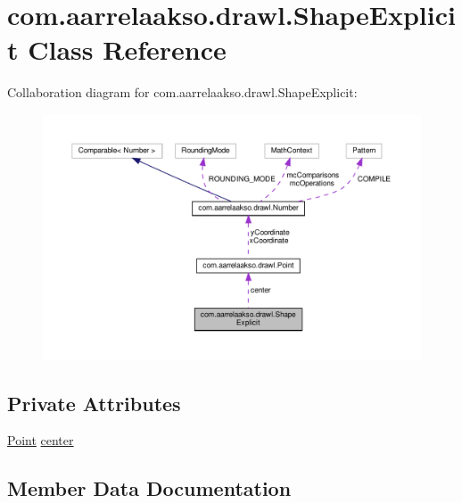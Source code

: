 \hypertarget{classcom_1_1aarrelaakso_1_1drawl_1_1_shape_explicit}{}\section{com.\+aarrelaakso.\+drawl.\+Shape\+Explicit Class Reference}
\label{classcom_1_1aarrelaakso_1_1drawl_1_1_shape_explicit}


Collaboration diagram for com.\+aarrelaakso.\+drawl.\+Shape\+Explicit\+:\nopagebreak
\begin{figure}[H]
\begin{center}
\leavevmode
\includegraphics[width=350pt]{de/d31/classcom_1_1aarrelaakso_1_1drawl_1_1_shape_explicit__coll__graph}
\end{center}
\end{figure}
\subsection*{Private Attributes}
\begin{DoxyCompactItemize}
\item 
\hyperlink{classcom_1_1aarrelaakso_1_1drawl_1_1_point}{Point} \hyperlink{classcom_1_1aarrelaakso_1_1drawl_1_1_shape_explicit_aecea9209d9d5d5803acd7ff7b8ec9642}{center}
\end{DoxyCompactItemize}


\subsection{Member Data Documentation}
\mbox{\label{classcom_1_1aarrelaakso_1_1drawl_1_1_shape_explicit_aecea9209d9d5d5803acd7ff7b8ec9642}} 
